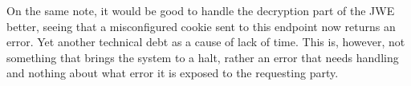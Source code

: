 \begin{enumerate}[label=$\blacktriangleright$]
        On the same note, it would be good to handle the decryption part of
        the JWE better, seeing that a misconfigured cookie sent to this
        endpoint now returns an error.
        Yet another technical debt as a cause of lack of time.
        This is, however, not something that brings the system to a halt,
        rather an error that needs handling and nothing about what error it
        is exposed to the requesting party.
    \end{enumerate}